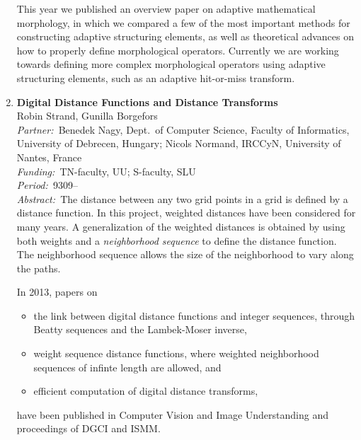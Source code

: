 \documentclass[10pt, a4paper]{article}
\newcommand{\aabstract}[1]{\emph{Abstract:~}#1}
\newcommand{\ffunding}[1]{\emph{Funding:~}#1\\}
\newcommand{\ppartner}[1]{\emph{Partner:~}#1\\}
\newcommand{\pperiod}[1]{\emph{Period:~}#1\\}
\begin{document}
\begin{enumerate}
{This year we published an overview paper on adaptive mathematical morphology, in which we compared a few of the most important methods for constructing adaptive structuring elements, as well as theoretical advances on how to properly define morphological operators. Currently we are working towards defining more complex morphological operators using adaptive structuring elements, such as an adaptive hit-or-miss transform.}


\item 
\label{proj:DT}
\textbf{Digital Distance Functions and Distance Transforms} \\
Robin Strand, Gunilla Borgefors \\
\ppartner{Benedek Nagy, Dept.~of Computer Science, Faculty of Informatics, University of Debrecen, Hungary; Nicols Normand, IRCCyN, University of Nantes, France}
\ffunding{TN-faculty, UU; S-faculty, SLU}
\pperiod{9309--}
\aabstract{The distance between any two grid points in a grid is defined by a distance function. In this project, weighted distances have been considered for many years. A generalization of the weighted distances is obtained by using both weights and a \textit{neighborhood sequence} to define the distance function. The neighborhood sequence allows the size of the neighborhood to vary along the paths. 

In 2013, papers on 
\begin{itemize}
\item the link between digital distance functions and integer sequences, through Beatty sequences and the Lambek-Moser inverse,
\item weight sequence distance functions, where weighted neighborhood sequences of infinte length are allowed, and
\item efficient computation of digital distance transforms, 
\end{itemize}
have been published in Computer Vision and Image Understanding and proceedings of DGCI and ISMM.}



\end{enumerate}
\end{document}
